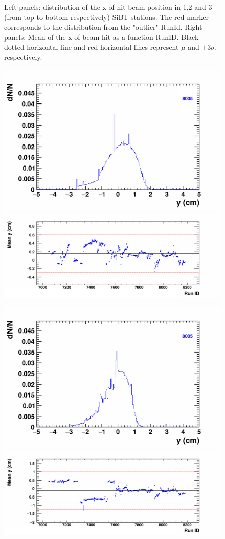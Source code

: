 \begin{figure}[H]
\begin{center}
            \vspace{-3mm}
            \caption{Left panels: distribution of the x of hit beam position in 1,2 and 3 (from top to bottom respectively) SiBT stations. The red marker corresponds to the distribution from the "outlier" RunId. Right panels: Mean of the x of beam hit as a function RunID. Black dotted horizontal line and red horizontal lines represent $\mu$ and $\pm3\sigma$, respectively.}
            \label{fig:SiBT_x}
        \end{center}
        \vspace{-5mm}
    \end{figure}

    \begin{figure}[H]
        \begin{center}
            \includegraphics[width=0.35\linewidth]{../pict/QA_RunByRun_24.12/H1/nVtxTr_h2_RunId_beam_hit_y_st0.png}
            \includegraphics[width=0.60\linewidth]{../pict/QA_RunByRun_24.12/nVtxTr_h2_RunId_beam_hit_y_st0.png}

            \includegraphics[width=0.35\linewidth]{../pict/QA_RunByRun_24.12/H1/nVtxTr_h2_RunId_beam_hit_y_st1.png}
            \includegraphics[width=0.60\linewidth]{../pict/QA_RunByRun_24.12/nVtxTr_h2_RunId_beam_hit_y_st1.png}


\end{center}
\end{figure}
